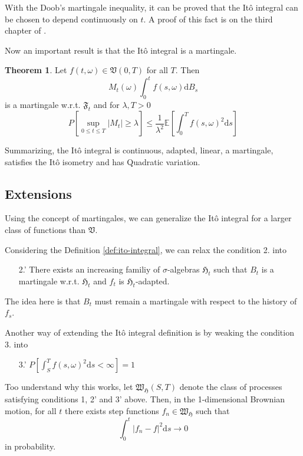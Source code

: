 \documentclass[12pt,a4paper]{article}
\theoremstyle{definition}
\newtheorem{theorem}{Theorem}[section]
\begin{document}
With the Doob's martingale inequality, it can be proved that the Itô integral can be chosen to depend continuously on $t$. A proof of this fact is on the third chapter of \cite{oksendal2013stochastic}.

Now an important result is that the Itô integral is a martingale.

\begin{theorem}
	Let $f(t, \omega) \in \mathfrak{V}(0,T)$ for all $T$. Then
	\[
		M_t(\omega)  \int_0^t f(s,\omega)\mathrm{d}B_s
	\]
	is a martingale w.r.t. $\mathfrak{F}_t$ and for $\lambda, T > 0$
	\[
		P \left[ \sup_{0 \leq t \leq T} |M_t| \geq \lambda \right] \leq \frac{1}{\lambda^2} \mathbb{E} \left[ \int_0^T f(s,\omega)^2 \mathrm{d}s \right]
	\]
\end{theorem}

Summarizing, the Itô integral is continuous, adapted, linear, a martingale, satisfies the Itô isometry and has Quadratic variation.

\subsection{Extensions}

Using the concept of martingales, we can generalize the Itô integral for a larger class of functions than $\mathfrak{V}$.

Considering the Definition \ref{def:ito-integral}, we can relax the condition 2. into
\begin{itemize}
	\item[2.'] There exists an increasing familiy of $\sigma$-algebras $\mathfrak{H}_t$ such that $B_t$ is a martingale w.r.t. $\mathfrak{H}_t$ and $f_t$ is $\mathfrak{H}_t$-adapted.
\end{itemize}

The idea here is that $B_t$ must remain a martingale with respect to the history of $f_s$. 

Another way of extending the Itô integral definition is by weaking the condition 3. into
\begin{itemize}
	\item[3.'] $P \left[ \int_S^T f(s, \omega)^2 \mathrm{d}s < \infty \right] = 1$
\end{itemize}

Too understand why this works, let $\mathfrak{W}_{\mathfrak{H}} (S,T)$ denote the class of processes satisfying conditions 1, 2' and 3' above. Then, in the 1-dimensional Brownian motion, for all $t$ there exists step functions $f_n \in \mathfrak{W}_{\mathfrak{H}}$ such that
\[
	\int_0^t |f_n - f|^2 \mathrm{d}s \longrightarrow 0
\]
in probability.
\end{document}
